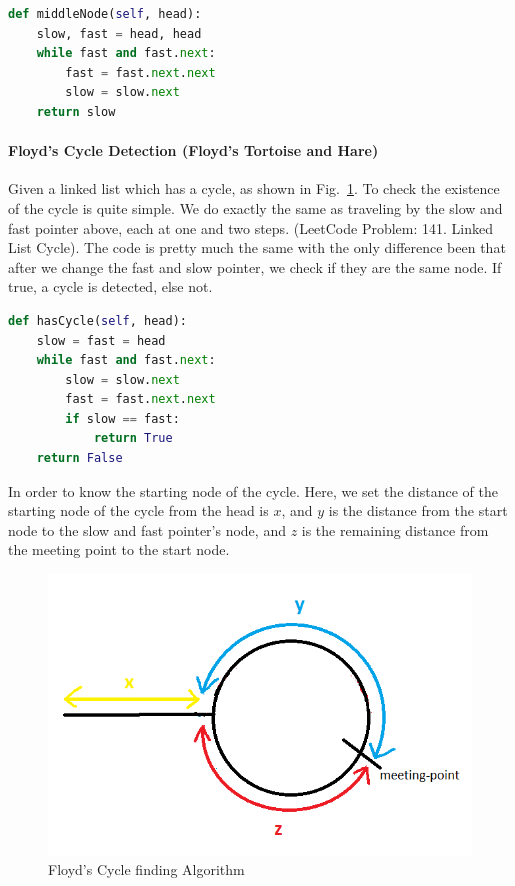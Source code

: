 \documentclass[../searching.tex]{subfiles}
\begin{document}
\begin{lstlisting}[language=Python]
def middleNode(self, head):
    slow, fast = head, head
    while fast and fast.next:        
        fast = fast.next.next
        slow = slow.next     
    return slow
\end{lstlisting}

\paragraph{Floyd's Cycle Detection (Floyd's Tortoise and Hare)} Given a linked list which has a cycle, as shown in Fig.~\ref{fig:floyd_cycle}. To check the existence of the cycle is quite simple. We do exactly the same as traveling by the slow and fast pointer above, each at one and two steps. (LeetCode Problem: 141. Linked List Cycle). The  code is pretty much the same with the only difference been that after we change the fast and slow pointer, we check if they are the same node. If true, a cycle is detected, else not. 
\begin{lstlisting}[language=Python]
def hasCycle(self, head):
    slow = fast = head
    while fast and fast.next:
        slow = slow.next
        fast = fast.next.next
        if slow == fast:
            return True
    return False
\end{lstlisting}

In order to know the starting node of the cycle. Here, we set the distance of the starting node of the cycle from the head is $x$, and $y$ is the distance from the start node to the slow and fast pointer's node, and $z$ is the remaining distance from the meeting point to the start node. 
\begin{figure}[h!]
    \centering
    \includegraphics[width=0.7\columnwidth]{fig/TQoyH.png}
    \caption{Floyd's Cycle finding Algorithm}
    \label{fig:floyd_cycle}
\end{figure}
\end{document}
